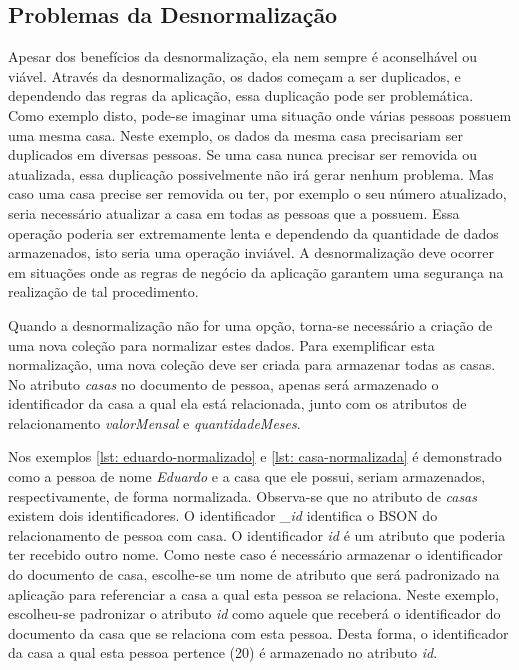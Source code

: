 \subsection{Problemas da Desnormalização}
    
Apesar dos benefícios da desnormalização, ela nem sempre é aconselhável ou viável. Através da desnormalização, os dados começam a ser duplicados, e dependendo das regras da aplicação, essa duplicação pode ser problemática. Como exemplo disto, pode-se imaginar uma situação onde várias pessoas possuem uma mesma casa. Neste exemplo, os dados da mesma casa precisariam ser duplicados em diversas pessoas. Se uma casa nunca precisar ser removida ou atualizada, essa duplicação possivelmente não irá gerar nenhum problema. Mas caso uma casa precise ser removida ou ter, por exemplo o seu número atualizado, seria necessário atualizar a casa em todas as pessoas que a possuem. Essa operação poderia ser extremamente lenta e dependendo da quantidade de dados armazenados, isto seria uma operação inviável. A desnormalização deve ocorrer em situações onde as regras de negócio da aplicação garantem uma segurança na realização de tal procedimento.
    
Quando a desnormalização não for uma opção, torna-se necessário a criação de uma nova coleção para normalizar estes dados. Para exemplificar esta normalização, uma nova coleção deve ser criada para armazenar todas as casas. No atributo \textit{casas} no documento de pessoa, apenas será armazenado o identificador da casa a qual ela está relacionada, junto com os atributos de relacionamento \textit{valorMensal} e \textit{quantidadeMeses}. 

Nos exemplos \ref{lst: eduardo-normalizado} e \ref{lst: casa-normalizada} é demonstrado como a pessoa de nome \textit{Eduardo} e a casa que ele possui, seriam armazenados, respectivamente, de forma normalizada. Observa-se que no atributo de \textit{casas} existem dois identificadores. O identificador \textit{\_id} identifica o BSON do relacionamento de pessoa com casa. O identificador \textit{id} é um atributo que poderia ter recebido outro nome. Como neste caso é necessário armazenar o identificador do documento de casa, escolhe-se um nome de atributo que será padronizado na aplicação para referenciar a casa a qual esta pessoa se relaciona. Neste exemplo, escolheu-se padronizar o atributo \textit{id} como aquele que receberá o identificador do documento da casa que se relaciona com esta pessoa. Desta forma, o identificador da casa a qual esta pessoa pertence (20) é armazenado no atributo \textit{id}. 
    
